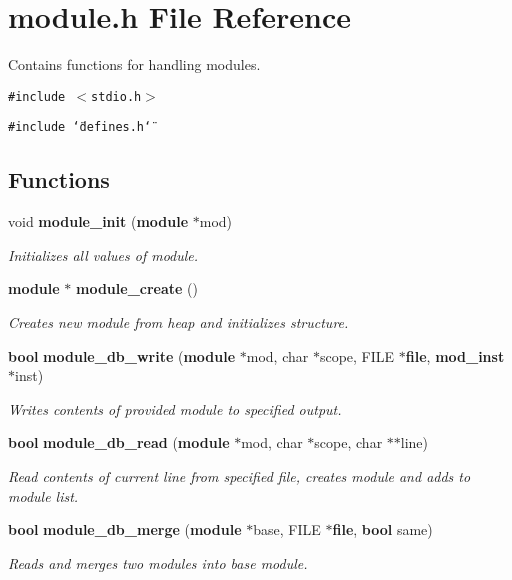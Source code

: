 \section{module.h File Reference}
\label{module_8h}
Contains functions for handling modules. 


{\tt \#include $<$stdio.h$>$}\par
{\tt \#include \char`\"{}defines.h\char`\"{}}\par
\subsection*{Functions}
\begin{CompactItemize}
\item 
void {\bf module\_\-init} ({\bf module} $\ast$mod)
\begin{CompactList}\small\item\em Initializes all values of module.\item\end{CompactList}\item 
{\bf module} $\ast$ {\bf module\_\-create} ()
\begin{CompactList}\small\item\em Creates new module from heap and initializes structure.\item\end{CompactList}\item 
{\bf bool} {\bf module\_\-db\_\-write} ({\bf module} $\ast$mod, char $\ast$scope, FILE $\ast${\bf file}, {\bf mod\_\-inst} $\ast$inst)
\begin{CompactList}\small\item\em Writes contents of provided module to specified output.\item\end{CompactList}\item 
{\bf bool} {\bf module\_\-db\_\-read} ({\bf module} $\ast$mod, char $\ast$scope, char $\ast$$\ast$line)
\begin{CompactList}\small\item\em Read contents of current line from specified file, creates module and adds to module list.\item\end{CompactList}\item 
{\bf bool} {\bf module\_\-db\_\-merge} ({\bf module} $\ast$base, FILE $\ast${\bf file}, {\bf bool} same)
\begin{CompactList}\small\item\em Reads and merges two modules into base module.\item\end{CompactList}\item 
$$
\end{CompactItemize}
